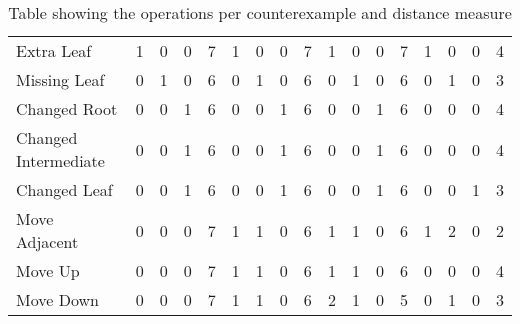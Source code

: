 \begin{table*}
{\begin{tabular}{lcccccccccccccccc}
            Extra Leaf           & 1                                    & 0                                        & 0                                      & 7                                       & 1      & 0   & 0      & 7     & 1      & 0   & 0      & 7     & 1      & 0   & 0      & 4     \\
            Missing Leaf         & 0                                    & 1                                        & 0                                      & 6                                       & 0      & 1   & 0      & 6     & 0      & 1   & 0      & 6     & 0      & 1   & 0      & 3     \\
            Changed Root         & 0                                    & 0                                        & 1                                      & 6                                       & 0      & 0   & 1      & 6     & 0      & 0   & 1      & 6     & 0      & 0   & 0      & 4     \\
            Changed Intermediate & 0                                    & 0                                        & 1                                      & 6                                       & 0      & 0   & 1      & 6     & 0      & 0   & 1      & 6     & 0      & 0   & 0      & 4     \\
            Changed Leaf         & 0                                    & 0                                        & 1                                      & 6                                       & 0      & 0   & 1      & 6     & 0      & 0   & 1      & 6     & 0      & 0   & 1      & 3     \\
            Move Adjacent        & 0                                    & 0                                        & 0                                      & 7                                       & 1      & 1   & 0      & 6     & 1      & 1   & 0      & 6     & 1      & 2   & 0      & 2     \\
            Move Up              & 0                                    & 0                                        & 0                                      & 7                                       & 1      & 1   & 0      & 6     & 1      & 1   & 0      & 6     & 0      & 0   & 0      & 4     \\
            Move Down            & 0                                    & 0                                        & 0                                      & 7                                       & 1      & 1   & 0      & 6     & 2      & 1   & 0      & 5     & 0      & 1   & 0      & 3     \\
            \bottomrule
        \end{tabular}

    }
    \caption{Table showing the operations per counterexample and distance measure}
\end{table*}